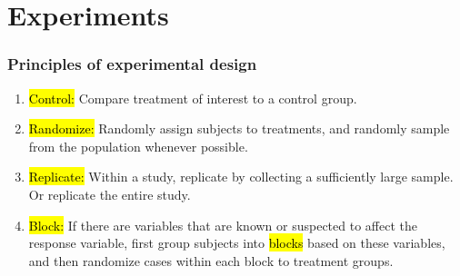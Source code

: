 
\section{Experiments}


\begin{frame}
\frametitle{Principles of experimental design}

\begin{enumerate}

\item \hl{Control:} Compare treatment of interest to a control group.

\item \hl{Randomize:} Randomly assign subjects to treatments, and randomly sample from the population whenever possible.

\item \hl{Replicate:} Within a study, replicate by collecting a sufficiently large sample. Or replicate the entire study.

\item \hl{Block:} If there are variables that are known or suspected to affect the response variable, first group subjects into \hl{blocks} based on these variables, and then randomize cases within each block to treatment groups.

\end{enumerate}

\end{frame}


